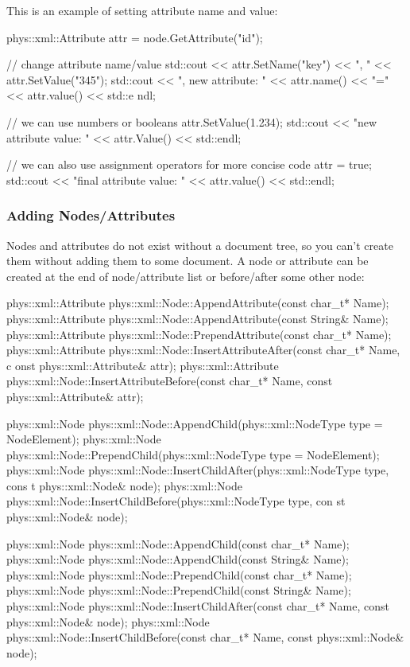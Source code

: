  \par
 This is an example of setting attribute name and value: 
\begin{DoxyCode}
 phys::xml::Attribute attr = node.GetAttribute("id");

 // change attribute name/value
 std::cout << attr.SetName("key") << ", " << attr.SetValue("345");
 std::cout << ", new attribute: " << attr.name() << "=" << attr.value() << std::e
      ndl;

 // we can use numbers or booleans
 attr.SetValue(1.234);
 std::cout << "new attribute value: " << attr.Value() << std::endl;

 // we can also use assignment operators for more concise code
 attr = true;
 std::cout << "final attribute value: " << attr.value() << std::endl;
\end{DoxyCode}
 \hypertarget{XMLManual_XMLModifyingAdding}{}\subsubsection{Adding Nodes/Attributes}\label{XMLManual_XMLModifyingAdding}
Nodes and attributes do not exist without a document tree, so you can't create them without adding them to some document. A node or attribute can be created at the end of node/attribute list or before/after some other node: 
\begin{DoxyCode}
 phys::xml::Attribute phys::xml::Node::AppendAttribute(const char_t* Name);
 phys::xml::Attribute phys::xml::Node::AppendAttribute(const String& Name);
 phys::xml::Attribute phys::xml::Node::PrependAttribute(const char_t* Name);
 phys::xml::Attribute phys::xml::Node::InsertAttributeAfter(const char_t* Name, c
      onst phys::xml::Attribute& attr);
 phys::xml::Attribute phys::xml::Node::InsertAttributeBefore(const char_t* Name, 
      const phys::xml::Attribute& attr);

 phys::xml::Node phys::xml::Node::AppendChild(phys::xml::NodeType type = 
      NodeElement);
 phys::xml::Node phys::xml::Node::PrependChild(phys::xml::NodeType type = 
      NodeElement);
 phys::xml::Node phys::xml::Node::InsertChildAfter(phys::xml::NodeType type, cons
      t phys::xml::Node& node);
 phys::xml::Node phys::xml::Node::InsertChildBefore(phys::xml::NodeType type, con
      st phys::xml::Node& node);

 phys::xml::Node phys::xml::Node::AppendChild(const char_t* Name);
 phys::xml::Node phys::xml::Node::AppendChild(const String& Name);
 phys::xml::Node phys::xml::Node::PrependChild(const char_t* Name);
 phys::xml::Node phys::xml::Node::PrependChild(const String& Name);
 phys::xml::Node phys::xml::Node::InsertChildAfter(const char_t* Name, const 
      phys::xml::Node& node);
 phys::xml::Node phys::xml::Node::InsertChildBefore(const char_t* Name, const 
      phys::xml::Node& node);
\end{DoxyCode}

